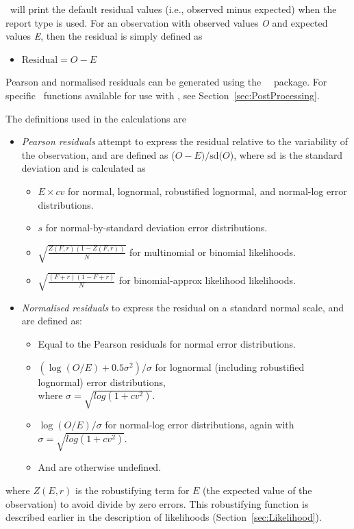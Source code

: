 \CNAME\ will print the default residual values (i.e., observed minus expected) when the report type  is used. For an observation with observed values \textit{O} and expected values \textit{E}, then the residual is simply defined as

\begin{itemize}
	\item $\text{Residual} = O - E$
\end{itemize}

Pearson and normalised residuals can be generated using the \CNAME\ \R\ package. For specific \R\ functions available for use with \CNAME, see Section~\ref{sec:PostProcessing}.

The definitions used in the calculations are

\begin{itemize}
	\item \textit{Pearson residuals} attempt to express the residual relative to the variability of the observation, and are defined as ($O-E)/\text{sd}(O$), where $\text{sd}$ is the standard deviation and is calculated as
	\begin{itemize}
		\item $E \times cv$ for normal, lognormal, robustified lognormal, and normal-log error distributions.
		\item $s$ for normal-by-standard deviation error distributions.
		\item $\sqrt{\frac{Z(\textit{F},r)(1 - Z(\textit{F},r))}{N}}$ for multinomial or binomial likelihoods.
		\item $\sqrt{\frac{(\textit{F} + r)(1 - \textit{F} + r)}{N}}$ for binomial-approx likelihood likelihoods.
	\end{itemize}
	\item \textit{Normalised residuals} to express the residual on a standard normal scale, and are defined as:
	\begin{itemize}
		\item Equal to the Pearson residuals for normal error distributions.
		\item $(\log(O/E)+0.5\sigma^2)/\sigma$ for lognormal (including robustified lognormal) error distributions,\\ where $\sigma= \sqrt{log(1 + cv^2)}$.
		\item  $\log(O/E)/\sigma$ for normal-log error distributions, again with $\sigma= \sqrt{log(1 + cv^2)}$.
		\item And are otherwise undefined.
	\end{itemize}
\end{itemize}

where $Z(\textit{E},r)$ is the robustifying term for $E$ (the expected value of the observation) to avoid divide by zero errors. This robustifying function is described earlier in the description of likelihoods (Section~\ref{sec:Likelihood}).
